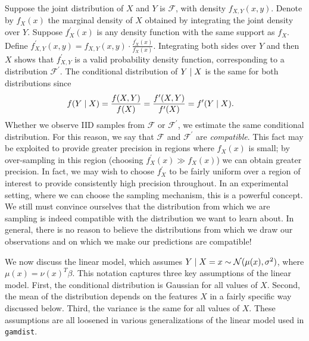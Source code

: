 \documentclass[12pt]{article}
\newcommand{\gamdist}{\texttt{gamdist}}
\begin{document}
Suppose the joint distribution of $X$ and $Y$ is $\mathcal{F}$, with density $f_{X, Y}(x, y)$. Denote by $f_X(x)$ the marginal density of $X$ obtained by integrating the joint density over $Y$. Suppose $f_X^\prime(x)$ is any density function with the same support as $f_X$. Define $f_{X, Y}^\prime (x, y) = f_{X, Y}(x, y) \cdot \frac{f_X^\prime(x)}{f_X(x)}$. Integrating both sides over $Y$ and then $X$ shows that $f_{X, Y}^\prime$ is a valid probability density function, corresponding to a distribution $\mathcal{F}^\prime$. The conditional distribution of $Y \; | \; X$ is the same for both distributions since
\begin{align*}
   f(Y \; | \; X) &= \frac{f(X, Y)}{f(X)} = \frac{f^\prime(X, Y)}{f^\prime(X)} = f^\prime(Y \; | \; X).
\end{align*}
Whether we observe IID samples from $\mathcal{F}$ or $\mathcal{F}^\prime$, we estimate the same conditional distribution. For this reason, we say that $\mathcal{F}$ and $\mathcal{F}^\prime$ are \emph{compatible}. This fact may be exploited to provide greater precision in regions where $f_X(x)$ is small; by over-sampling in this region (choosing $f_X^\prime(x) \gg f_X(x)$) we can obtain greater precision. In fact, we may wish to choose $f_X^\prime$ to be fairly uniform over a region of interest to provide consistently high precision throughout. In an experimental setting, where we can choose the sampling mechanism, this is a powerful concept. We still must convince ourselves that the distribution from which we are sampling is indeed compatible with the distribution we want to learn about. In general, there is no reason to believe the distributions from which we draw our observations and on which we make our predictions are compatible!

We now discuss the linear model, which assumes $Y \; | \; X = x \sim {\mathcal N} (\mu(x), \sigma^2)$, where $\mu(x) = \nu(x)^T \beta$. This notation captures three key assumptions of the linear model. First, the conditional distribution is Gaussian for all values of $X$. Second, the mean of the distribution depends on the features $X$ in a fairly specific way discussed below. Third, the variance is the same for all values of $X$. These assumptions are all loosened in various generalizations of the linear model used in \gamdist{}.
\end{document}
